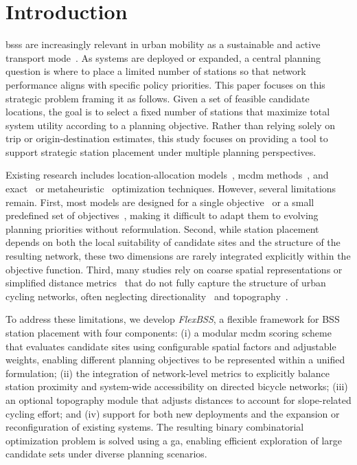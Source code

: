 \section{Introduction}

\acp{bss} are increasingly relevant in urban mobility as a sustainable and active transport mode~\cite{Fishman2016, MeddinWorldMap2025}. As systems are deployed or expanded, a central planning question is where to place a limited number of stations so that network performance aligns with specific policy priorities. This paper focuses on this strategic problem framing it as follows. Given a set of feasible candidate locations, the goal is to select a fixed number of stations that maximize total system utility according to a planning objective. Rather than relying solely on trip or origin-destination estimates, this study focuses on providing a tool to support strategic station placement under multiple planning perspectives.

Existing research includes location-allocation models~\cite{Frade2015, Mete2018}, \ac{mcdm} methods~\cite{Kabak2018, Bahadori2022}, and exact~\cite{Cintrano2018} or metaheuristic~\cite{Qian2022, Caggiani2020} optimization techniques. However, several limitations remain. First, most models are designed for a single objective~\cite{Kabak2018, Bahadori2022, Fazio2021} or a small predefined set of objectives~\cite{Conrow2018, Qian2022, Caggiani2020, Duran-Rodas2021, Fan2024, Nikiforiadis2021}, making it difficult to adapt them to evolving planning priorities without reformulation. Second, while station placement depends on both the local suitability of candidate sites and the structure of the resulting network, these two dimensions are rarely integrated explicitly within the objective function. Third, many studies rely on coarse spatial representations or simplified distance metrics~\cite{Frade2015, Fazio2021, Veillette2018, Nikiforiadis2021} that do not fully capture the structure of urban cycling networks, often neglecting directionality~\cite{Cintrano2018, Xin2013} and topography~\cite{Fazio2021, Kabak2018, Ebrahimi2022, Tera2023}.

To address these limitations, we develop \textit{FlexBSS}, a flexible framework for BSS station placement with four components: (i) a modular \ac{mcdm} scoring scheme that evaluates candidate sites using configurable spatial factors and adjustable weights, enabling different planning objectives to be represented within a unified formulation; (ii) the integration of network-level metrics to explicitly balance station proximity and system-wide accessibility on directed bicycle networks; (iii) an optional topography module that adjusts distances to account for slope-related cycling effort; and (iv) support for both new deployments and the expansion or reconfiguration of existing systems. The resulting binary combinatorial optimization problem is solved using a \ac{ga}, enabling efficient exploration of large candidate sets under diverse planning scenarios.

